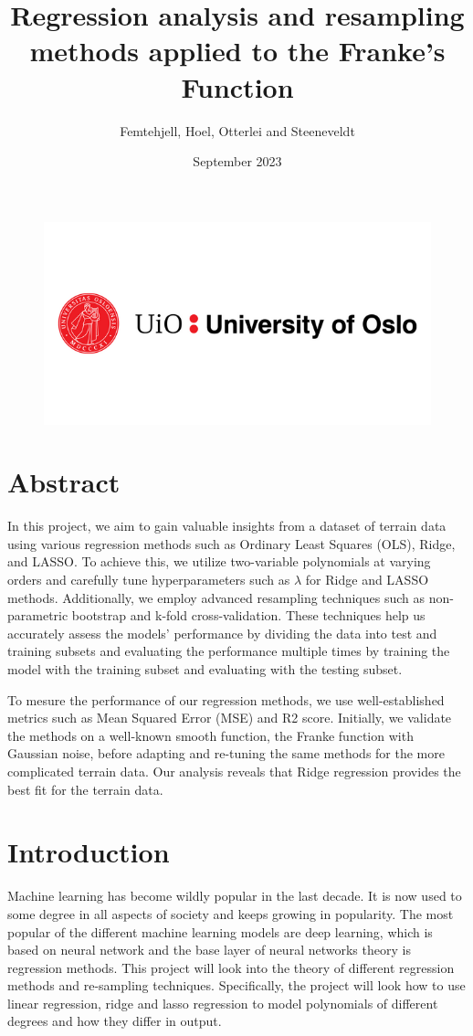 \documentclass{article}
\title{Regression analysis and resampling methods applied to the Franke's Function}
\author{Femtehjell, Hoel, Otterlei and Steeneveldt}
\date{September 2023}
\begin{document}
\maketitle
\begin{figure}[H]
    \centering
    \includegraphics[scale=0.5]{Project1/1797261_uio-logo.png}
\end{figure}
\newpage
\tableofcontents
\newpage

\section*{Abstract}

In this project, we aim to gain valuable insights from a dataset of terrain data using various regression methods such as Ordinary Least Squares (OLS), Ridge, and LASSO. To achieve this, we utilize two-variable polynomials at varying orders and carefully tune hyperparameters such as $\lambda$ for Ridge and LASSO methods. Additionally, we employ advanced resampling techniques such as non-parametric bootstrap and k-fold cross-validation. These techniques help us accurately assess the models' performance by dividing the data into test and training subsets and evaluating the performance multiple times by training the model with the training subset and evaluating with the testing subset.

To mesure the performance of our regression methods, we use well-established metrics such as Mean Squared Error (MSE) and R2 score. Initially, we validate the methods on a well-known smooth function, the Franke function with Gaussian noise, before adapting and re-tuning the same methods for the more complicated terrain data. Our analysis reveals that Ridge regression provides the best fit for the terrain data.
\section{Introduction}
Machine learning has become wildly popular in the last decade. It is now used to some degree in all aspects of society and keeps growing in popularity. The most popular of the different machine learning models are deep learning, which is based on neural network and the base layer of neural networks theory is regression methods. This project will look into the theory of different regression methods and re-sampling techniques. Specifically, the project will look how to use linear regression, ridge and lasso regression to model polynomials of different degrees and how they differ in output.
\end{document}
